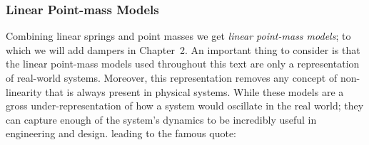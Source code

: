 \documentclass[12pt,letter]{article}
\begin{document}
		\subsubsection{Linear Point-mass Models}
		
			Combining linear springs and point masses we get \emph{linear point-mass models}; to which we will add dampers in Chapter~2. An important thing to consider is that the linear point-mass models used throughout this text are only a representation of real-world systems. Moreover, this representation removes any concept of non-linearity that is always present in physical systems. While these models are a gross under-representation of how a system would oscillate in the real world; they can capture enough of the system's dynamics to be incredibly useful in engineering and design. leading to the famous quote:   
\end{document}
